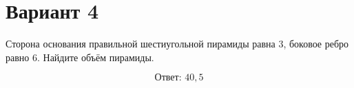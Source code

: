 \documentclass[12pt,a4paper]{article}
\begin{document}
\section*{Вариант 4}

Сторона основания правильной шестиугольной пирамиды равна 3, боковое ребро равно 6. Найдите объём пирамиды.

\begin{center}
\end{center}

\[
\boxed{\text{Ответ: }40{,}5}
\]
\end{document}
